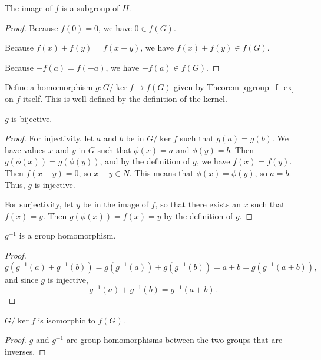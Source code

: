 \documentclass[../../math.tex]{subfiles}
\begin{document}
\begin{theorem}
    The image of $f$ is a subgroup of $H$.
\end{theorem}
\begin{proof}
    Because $f(0) = 0$, we have $0 \in f(G)$.

    Because $f(x) + f(y) = f(x + y)$, we have $f(x) + f(y) \in f(G)$.

    Because $-f(a) = f(-a)$, we have $-f(a) \in f(G)$.
\end{proof}

\begin{definition}
    Define a homomorphism $g : G/{\ker f} \to f(G)$ given by Theorem
    \ref{qgroup_f_ex} on $f$ itself.  This is well-defined by the definition of
    the kernel.
\end{definition}

\begin{instance}
    $g$ is bijective.
\end{instance}
\begin{proof}
    For injectivity, let $a$ and $b$ be in $G/{\ker f}$ such that $g(a) = g(b)$.
    We have values $x$ and $y$ in $G$ such that $\phi(x) = a$ and $\phi(y) = b$.
    Then $g(\phi(x)) = g(\phi(y))$, and by the definition of $g$, we have $f(x)
    = f(y)$.  Then $f(x - y) = 0$, so $x - y \in N$.  This means that $\phi(x) =
    \phi(y)$, so $a = b$.  Thus, $g$ is injective.

    For surjectivity, let $y$ be in the image of $f$, so that there exists an
    $x$ such that $f(x) = y$.  Then $g(\phi(x)) = f(x) = y$ by the definition of
    $g$.
\end{proof}

\begin{instance}
    $g^{-1}$ is a group homomorphism.
\end{instance}
\begin{proof}
    \[
        g(g^{-1}(a) + g^{-1}(b))
        = g(g^{-1}(a)) + g(g^{-1}(b))
        = a + b
        = g(g^{-1}(a + b)),
    \]
    and since $g$ is injective,
    \[
        g^{-1}(a) + g^{-1}(b)
        = g^{-1}(a + b).
    \]
\end{proof}

\begin{theorem} \label{group_first_iso}
    $G/{\ker f}$ is isomorphic to $f(G)$.
\end{theorem}
\begin{proof}
    $g$ and $g^{-1}$ are group homomorphisms between the two groups that are
    inverses.
\end{proof}
\end{document}
